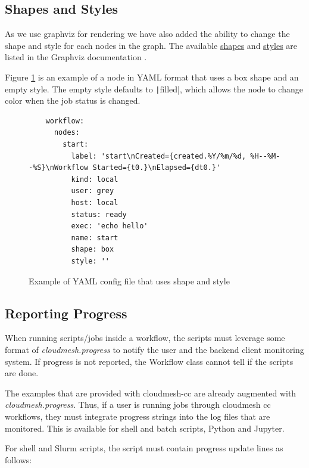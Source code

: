 \subsection{Shapes and Styles}

As we use graphviz for rendering we have also added the ability to
change the shape and style for each nodes in the graph. The
available \href{https://graphviz.org/doc/info/shapes.html}{shapes}
and \href{https://graphviz.org/docs/attr-types/style/}{styles} are
listed in the Graphviz documentation \cite{www-graphviz}.

Figure \ref{fig:shape-style-yaml} is an example of a node in YAML
format that uses a box shape and an empty style. The empty style
defaults to \texttt|filled|, which allows the node to change
color when the job status is changed.

\begin{figure}
    \begin{verbatim}
    workflow:
      nodes:
        start:
          label: 'start\nCreated={created.%Y/%m/%d, %H--%M--%S}\nWorkflow Started={t0.}\nElapsed={dt0.}'
          kind: local
          user: grey
          host: local
          status: ready
          exec: 'echo hello'
          name: start
          shape: box
          style: ''
    \end{verbatim}
    \caption{Example of YAML config file that uses shape and style}
    \label{fig:shape-style-yaml}
\end{figure}



\subsection{Reporting Progress}\label{reporting-progress}

When running scripts/jobs inside a workflow, the scripts must leverage
some format of {\em cloudmesh.progress} to notify the user and the
backend client monitoring system. If progress is not reported, the
Workflow class cannot tell if the scripts are done.

The examples that are provided with cloudmesh-cc are already augmented
with {\em cloudmesh.progress}. Thus, if a user is running jobs through
cloudmesh cc workflows, they must integrate progress strings into the
log files that are monitored. This is available for shell and batch
scripts, Python and Jupyter.

For shell and Slurm scripts, the script must contain progress update
lines as follows:

